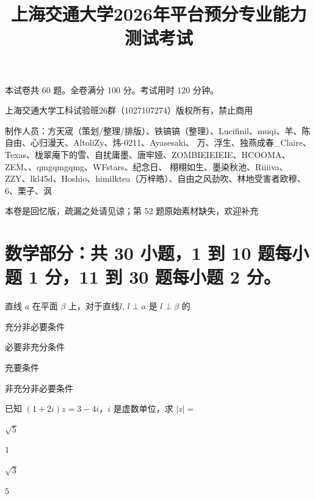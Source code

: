 \documentclass{exam-zh}
\title{上海交通大学2026年平台预分专业能力测试考试}
\newcommand{\zzzemoji}{\raisebox{-0.3em}{\twemoji[height=1.5em]{zzz}}}
\begin{document}


\maketitle

本试卷共 60 题。全卷满分 100 分。考试用时 120 分钟。


\begin{notice}
  \item 上海交通大学工科试验班26群（1027107274）版权所有，禁止商用
  \item 制作人员：方天{宬}（策划/整理/排版）、铁镐镐（整理）、Lucifinil、muqi、羊、陈自由、心归漫天、AltoliZy、炜-0211、Ayasesaki、
万、浮生、独燕成春\_Claire、Texas、栊翠庵下的雪、自扰庸墨、唐牢娅、ZOMBIEIEIEIE、HCOOMA、ZEM、\zzzemoji{}、qmgqmgqmg、WFstars、纪念日、
栩栩如生、墨染秋池、Riiiiva、ZZY、lkl45d、Hoshio、himilktea（万梓皓）、自由之风劲吹、林地受害者欧穆、6、栗子、沨
  \item 本卷是回忆版，疏漏之处请见谅；第 52 题原始素材缺失，欢迎补充
\end{notice}



\section{%
  数学部分：共 30 小题，1 到 10 题每小题 1 分，11 到 30 题每小题 2 分。
}

\begin{question}
直线 $a$ 在平面 $\beta$ 上，对于直线$l$, $l\perp a$ 是 $l\perp\beta$ 的 \paren[]
\begin{choices}
  \item 充分非必要条件
  \item 必要非充分条件
  \item 充要条件
  \item 非充分非必要条件
\end{choices}
\end{question}

\begin{question}
已知 $(1+2i)z=3-4i$，$i$ 是虚数单位，求 $|z|=$ \paren[]
\begin{choices}
  \item $\sqrt{5}$
  \item $1$
  \item $\sqrt{3}$
  \item $5$
\end{choices}
\end{question}
\end{document}
